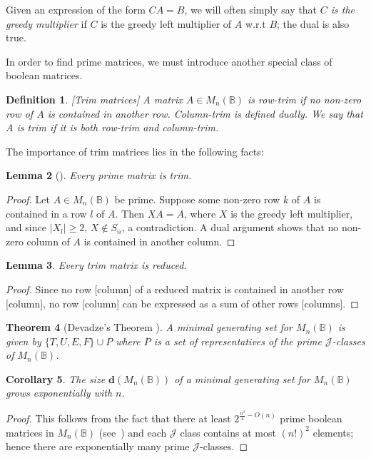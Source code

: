 \documentclass[11pt]{article}
\newtheorem{thm}{Theorem}[section]
\newtheorem{cor}[thm]{Corollary}
\newtheorem{lemma}[thm]{Lemma}
\newtheorem{defi}[thm]{Definition}
\newenvironment{de}{\begin{defi}\rm}{\end{defi}}
\numberwithin{equation}{section}
\newcommand{\B}{\mathbb{B}}
\newcommand{\Bn}{M_n(\B)}
\newcommand{\J}{\mathscr{J}}
\begin{document}
Given an expression of the form $CA = B$, we will often simply say that
\textit{$C$ is the greedy multiplier} if $C$ is the greedy left multiplier
of $A$ w.r.t $B$; the dual is also true.

In order to find prime matrices, we must introduce another special class of
boolean matrices.

\begin{de}[Trim matrices]
  A matrix $A \in \Bn$ is \emph{row-trim} if no non-zero row of $A$ is contained in
  another row. \emph{Column-trim} is defined dually. We say that $A$ is
  \emph{trim} if it is both row-trim and column-trim.
\end{de}

The importance of trim matrices lies in the following facts:
\begin{lemma}[\cite{Konieczny2011aa}]
  Every prime matrix is trim.
\end{lemma}
\begin{proof}
  Let $A \in \Bn$ be prime. Suppose some non-zero row $k$ of $A$ is contained in
  a row $l$ of $A$. Then $XA = A$, where $X$ is the greedy left multiplier, and
  since $|X_l| \geq 2$, $X \not\in S_n$, a contradiction. A dual argument shows   that no non-zero column of $A$ is contained in another column.
\end{proof}

\begin{lemma}
  Every trim matrix is reduced.
\end{lemma}
\begin{proof}
  Since no row [column] of a reduced matrix is contained in another row
  [column], no row [column] can be expressed as a sum of other rows [columns].
\end{proof}


\begin{thm}[Devadze's Theorem \cite{Konieczny2011aa}]
  A minimal generating set for $\Bn$ is given by $\{T, U, E, F\} \cup P$
  where $P$ is a set of representatives of the prime $\J$-classes of $\Bn$.
\end{thm}

\begin{cor}
  The size $\mathbf{d}(\Bn)$ of a minimal generating set for $\Bn$ grows
  exponentially with $n$.
\end{cor}
\begin{proof}
  This follows from the fact that there at least $2^{\frac{n^2}{4} - O(n)}$
  prime boolean matrices in $\Bn$ (see~\cite[Theorem 2.4.1]{Kim1982aa}) and each
  $\J$ class contains at most $(n!)^2$ elements; hence there are exponentially
  many prime $\J$-classes.
\end{proof}
\end{document}
